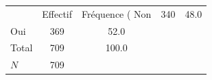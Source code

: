 {
\def\sym#1{\ifmmode^{#1}\else\(^{#1}\)\fi}
\begin{tabular}{l*{1}{cc}}
\toprule
            &    Effectif&Fréquence (%
\midrule
Non         &         340&        48.0\\
Oui         &         369&        52.0\\
Total       &         709&       100.0\\
\midrule
\(N\)       &         709&            \\
\bottomrule
\end{tabular}
}
